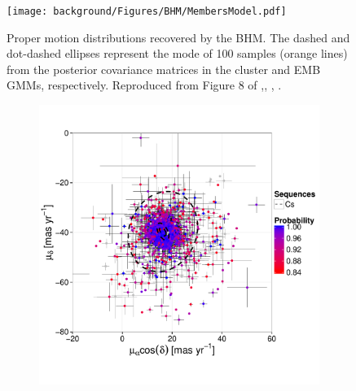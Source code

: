 \begin{figure}[ht!]
\begin{center}
\texttt{[image: background/Figures/BHM/MembersModel.pdf]}
\caption{Proper motion distributions recovered by the BHM. The dashed and dot-dashed ellipses represent the mode of 100 samples (orange lines) from the posterior covariance matrices in the cluster and EMB GMMs, respectively. Reproduced from Figure 8 of \citet{Olivares2017},\textit{}, , .}
\label{fig:PM}
\end{center}
\end{figure}

\begin{figure}[ht!]
    \centering
    \begin{subfigure}[t]{0.45\textwidth}
    \centering
       \includegraphics[page=2,width=\textwidth]{background/Figures/BHM/Cs_members.pdf}
        \caption{}
    \end{subfigure}
    \begin{subfigure}[t]{0.45\textwidth}
    \centering

\end{subfigure}
\end{figure}
